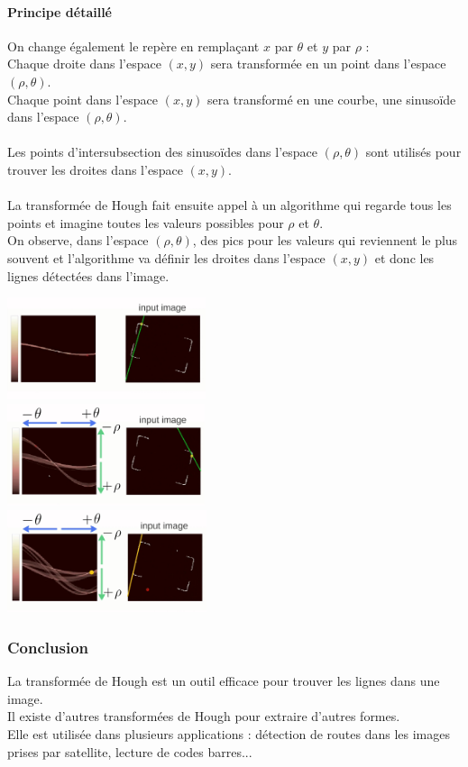 \paragraph{Principe d\'etaill\'e}
On change \'egalement le rep\`ere en rempla\c cant $x$ par $\theta$ et $y$ par $\rho$ : \\
Chaque droite dans l'espace $(x, y)$ sera transform\'ee en un point dans l'espace $(\rho, \theta)$. \\
Chaque point dans l'espace $(x, y)$ sera transform\'e en une courbe, une sinuso\"ide dans l'espace $(\rho, \theta)$. \\
 \\
Les points d'intersubsection des sinuso\"ides dans l'espace $(\rho, \theta)$ sont utilis\'es pour trouver les droites dans l'espace $(x, y)$. \\
 \\
La transform\'ee de Hough fait ensuite appel \`a un algorithme qui regarde tous les points et imagine toutes les valeurs possibles pour $\rho$ et $\theta$. \\
On observe, dans l'espace $(\rho, \theta)$, des pics pour les valeurs qui reviennent le plus souvent et l'algorithme va d\'efinir les droites dans l'espace $(x, y)$ et donc les lignes d\'etect\'ees dans l'image.
\begin{center}
\includegraphics[height=3cm]{images/hough_5.png} \\
\includegraphics[height=3cm]{images/hough_6.png} \\ 
\includegraphics[height=3cm]{images/hough_7.png}
\end{center}

\subsubsection{Conclusion}
La transform\'ee de Hough est un outil efficace pour trouver les lignes dans une image. \\
Il existe d'autres transform\'ees de Hough pour extraire d'autres formes. \\
Elle est utilis\'ee dans plusieurs applications : d\'etection de routes dans les images prises par satellite, lecture de codes barres...